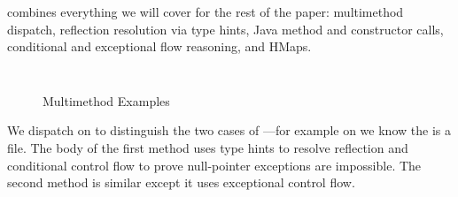 combines everything we will cover for the rest of the paper:
multimethod dispatch, reflection resolution via type hints, Java method
and constructor calls, conditional and exceptional flow reasoning,
and HMaps. 


\begin{figure}
\begin{exmp}
\inputminted[firstline=6,lastline=22]{clojure}{code/demo/src/demo/eg7.clj}
\label{example:multidispatch}
\end{exmp}
\begin{exmp}
\inputminted[firstline=6,lastline=20]{clojure}{code/demo/src/demo/eg8.clj}
\label{example:final}
\end{exmp}
\caption{Multimethod Examples}
\end{figure}

We dispatch on  to distinguish the two cases of ---for example on 
we know the  is a file.
The body of the first method uses type hints to resolve reflection
and conditional control flow to prove null-pointer exceptions are impossible.
The second method is similar except it uses exceptional control flow.
